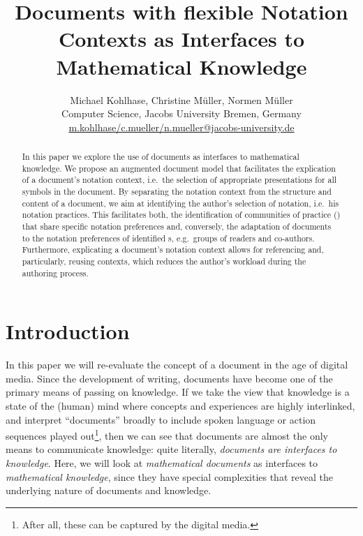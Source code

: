 \documentclass[a4paper]{article}
\title{Documents with flexible Notation Contexts as Interfaces to Mathematical Knowledge}
\author{Michael Kohlhase, Christine M{\"u}ller, Normen M{\"u}ller\\ 
  Computer Science, Jacobs University Bremen, Germany\\
  {\small\url{m.kohlhase/c.mueller/n.mueller@jacobs-university.de}}}
\date{}
\begin{document}
\maketitle

\begin{abstract}%
  In this paper we explore the use of documents as interfaces to mathematical
  knowledge. We propose an augmented document model that facilitates the explication of a
  document's notation context, i.e.\ the selection of appropriate presentations for all
  symbols in the document. By separating the notation context from the structure and
  content of a document, we aim at identifying the author's selection of notation, i.e.\
  his notation practices. This facilitates both, the identification of communities of
  practice ({\cop}) that share specific notation preferences and, conversely, the
  adaptation of documents to the notation preferences of identified {\cop}s, e.g.\ groups
  of readers and co-authors. Furthermore, explicating a document's notation context allows
  for referencing and, particularly, reusing contexts, which reduces the author's workload
  during the authoring process.
\end{abstract}

\section{Introduction}\label{sec:intro} 

In this paper we will re-evaluate the concept of a document in the age of digital
media. Since the development of writing, documents have become one of the primary means of
passing on knowledge. If we take the view that knowledge is a state of the (human) mind
where concepts and experiences are highly interlinked, and interpret ``documents'' broadly
to include spoken language or action sequences played out\footnote{After all, these can be
  captured by the digital media.}, then we can see that documents are almost the only
means to communicate knowledge: quite literally, {\emph{documents are interfaces to
    knowledge}}. Here, we will look at {\emph{mathematical documents}} as interfaces to
{\emph{mathematical knowledge}}, since they have special complexities that reveal the
underlying nature of documents and knowledge.
\end{document}
